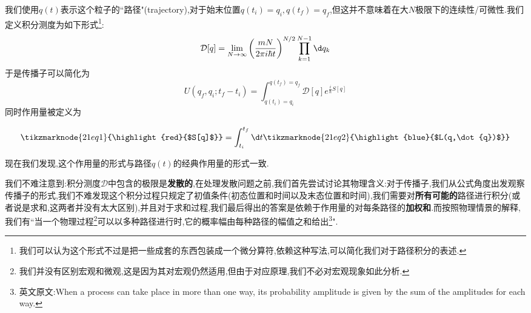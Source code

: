 我们使用$q(t)$表示这个粒子的``路径"(trajectory),对于始末位置$q(t_i)=q_i,q(t_f)=q_f$,但这并不意味着在大$ N $极限下的连续性/可微性.我们定义积分测度为如下形式\footnote{我们可以认为这个形式不过是把一些成套的东西包装成一个微分算符,依赖这种写法,可以简化我们对于路径积分的表述.}:
\begin{equation}
	\mathcal{D}[q]=\lim_{N\to\infty}\left(\frac{mN}{2\pi i\hbar t}\right)^{N/2}\prod_{k=1}^{N-1}\d q_k
\end{equation}
于是传播子可以简化为
\begin{equation}
	U(q_f,q_i;t_f-t_i)=\int_{q(t_i)=q_i}^{q(t_f)=q_f}\mathcal{D}[q]e^{\frac{i}{\hbar}S[q]}
\end{equation}
同时作用量被定义为

\begin{equation}
	\vspace{\baselineskip}
	\tikzmarknode{21eq1}{\highlight{red}{$S[q]$}}=\int_{t_i}^{t_f}\d t\tikzmarknode{21eq2}{\highlight{blue}{$L(q,\dot{q})$}}
\end{equation}

现在我们发现,这个作用量的形式与路径$q(t)$的经典作用量的形式一致.

我们不难注意到:积分测度$\mathcal D$中包含的极限是\textbf{发散的},在处理发散问题之前,我们首先尝试讨论其物理含义:对于传播子,我们从公式角度出发观察传播子的形式,我们不难发现这个积分过程只规定了初值条件(初态位置和时间以及末态位置和时间),我们需要对\textbf{所有可能的}路径进行积分(或者说是求和,这两者并没有太大区别),并且对于求和过程,我们最后得出的答案是依赖于作用量的对每条路径的\textbf{加权和}.而按照物理情景的解释,我们有``当一个物理过程\footnote{我们并没有区别宏观和微观,这是因为其对宏观仍然适用,但由于对应原理,我们不必对宏观现象如此分析.}可以以多种路径进行时,它的概率幅由每种路径的幅值之和给出\footnote{英文原文:When a
	process can take place in more than one way, its probability amplitude is given by the
	sum of the amplitudes for each way.}".

